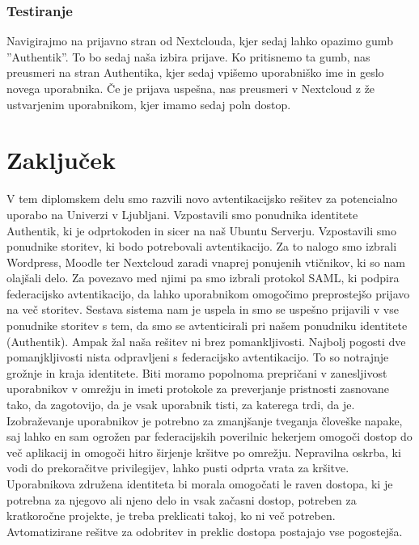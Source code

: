 \documentclass[a4paper,12pt,openright,oneside]{book}
\begin{document}
\subsection{Testiranje}
Navigirajmo na prijavno stran od Nextclouda, kjer sedaj lahko opazimo gumb ''Authentik''. To bo sedaj naša izbira prijave. Ko pritisnemo ta gumb, nas preusmeri na stran Authentika, kjer sedaj vpišemo uporabniško ime in geslo novega uporabnika. Če je prijava uspešna, nas preusmeri v Nextcloud z že ustvarjenim uporabnikom, kjer imamo sedaj poln dostop. 

\chapter{Zaključek}

V tem diplomskem delu smo razvili novo avtentikacijsko rešitev za potencialno uporabo na Univerzi v Ljubljani. Vzpostavili smo ponudnika identitete Authentik, ki je odprtokoden in sicer na naš Ubuntu Serverju. Vzpostavili smo ponudnike storitev, ki bodo potrebovali avtentikacijo. Za to nalogo smo izbrali Wordpress, Moodle ter Nextcloud zaradi vnaprej ponujenih vtičnikov, ki so nam olajšali delo. Za povezavo med njimi pa smo izbrali protokol SAML, ki podpira federacijsko avtentikacijo, da lahko uporabnikom omogočimo preprostejšo prijavo na več storitev. 
\newline
Sestava sistema nam je uspela in smo se uspešno prijavili v vse ponudnike storitev s tem, da smo se avtenticirali pri našem ponudniku identitete (Authentik). 
\newline
Ampak žal naša rešitev ni brez pomankljivosti. Najbolj pogosti dve pomanjkljivosti nista odpravljeni s federacijsko avtentikacijo. To so notrajnje grožnje in kraja identitete. Biti moramo popolnoma prepričani v zanesljivost uporabnikov v omrežju in imeti protokole za preverjanje pristnosti zasnovane tako, da zagotovijo, da je vsak uporabnik tisti, za katerega trdi, da je. Izobraževanje uporabnikov je potrebno za zmanjšanje tveganja človeške napake, saj lahko en sam ogrožen par federacijskih poverilnic hekerjem omogoči dostop do več aplikacij in omogoči hitro širjenje kršitve po omrežju.
Nepravilna oskrba, ki vodi do prekoračitve privilegijev, lahko pusti odprta vrata za kršitve. Uporabnikova združena identiteta bi morala omogočati le raven dostopa, ki je potrebna za njegovo ali njeno delo in vsak začasni dostop, potreben za kratkoročne projekte, je treba preklicati takoj, ko ni več potreben. Avtomatizirane rešitve za odobritev in preklic dostopa postajajo vse pogostejša.
\end{document}
